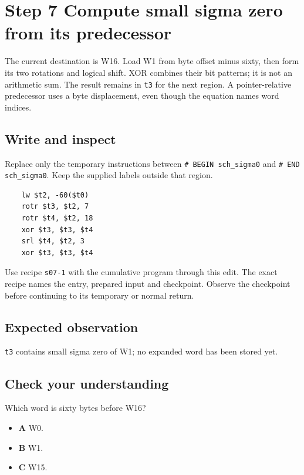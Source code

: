 \section{Step 7 Compute small sigma zero from its predecessor}\label{sha-s07}

The current destination is W16. Load W1 from byte offset minus sixty, then form its two rotations and logical shift. XOR combines their bit patterns; it is not an arithmetic sum. The result remains in \texttt{t3} for the next region. A pointer-relative predecessor uses a byte displacement, even though the equation names word indices.

\subsection{Write and inspect}
Replace only the temporary instructions between \texttt{\# BEGIN sch\_sigma0} and \texttt{\# END sch\_sigma0}. Keep the supplied labels outside that region.

\begin{verbatim}
    lw $t2, -60($t0)
    rotr $t3, $t2, 7
    rotr $t4, $t2, 18
    xor $t3, $t3, $t4
    srl $t4, $t2, 3
    xor $t3, $t3, $t4
\end{verbatim}

Use recipe \texttt{s07-1} with the cumulative program through this edit. The exact recipe names the entry, prepared input and checkpoint. Observe the checkpoint before continuing to its temporary or normal return.

\subsection{Expected observation}
\texttt{t3} contains small sigma zero of W1; no expanded word has been stored yet.

\subsection{Check your understanding}
Which word is sixty bytes before W16?

\begin{itemize}
  \item \textbf{A} W0.
  \item \textbf{B} W1.
  \item \textbf{C} W15.
\end{itemize}
